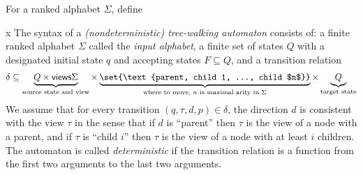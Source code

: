 \newcommand{\views}{\mathsf{views}}
For a ranked alphabet $\Sigma$, define 


\begin{definition}x
The syntax of a  \emph{(nondeterministic) tree-walking automaton} consists of: a finite ranked alphabet $\Sigma$ called the \emph{input alphabet}, a finite set of states $Q$ with a designated initial state $q$ and  accepting states $F \subseteq Q$, and a transition relation
		\begin{align*}
	\delta \subseteq \underbrace{Q \times \views \Sigma}_{\text{source state and view}} \times \underbrace{\set{\text{parent, child 1, ..., child $n$}}}_{\text{where to move, $n$ is maximal arity in $\Sigma$}} \times \underbrace{Q}_{\text{target state}}
		\end{align*}
		We assume that for every transition $(q,\tau,d,p) \in \delta$,  the direction $d$ is consistent with the view $\tau$ in the sense that if $d$ is ``parent'' then $\tau$ is the view of a node with a parent, and if $\tau$ is ``child $i$'' then $\tau$ is the view of a node with at least $i$ children.
The automaton is called \emph{deterministic} if the  transition relation is  a function from the first two arguments to the last two arguments.
\end{definition}

